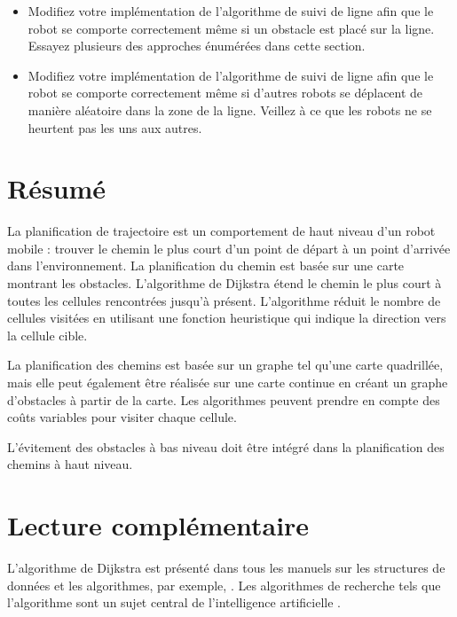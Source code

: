 \begin{framed}
\begin{itemize}
\item Modifiez votre implémentation de l'algorithme de suivi de ligne afin que le robot se comporte correctement même si un obstacle est placé sur la ligne. Essayez plusieurs des approches énumérées dans cette section.
\item Modifiez votre implémentation de l'algorithme de suivi de ligne afin que le robot se comporte correctement même si d'autres robots se déplacent de manière aléatoire dans la zone de la ligne. Veillez à ce que les robots ne se heurtent pas les uns aux autres.
\end{itemize}
\end{framed}

\section{Résumé}

La planification de trajectoire est un comportement de haut niveau d'un robot mobile : trouver le chemin le plus court d'un point de départ à un point d'arrivée dans l'environnement. La planification du chemin est basée sur une carte montrant les obstacles. L'algorithme de Dijkstra étend le chemin le plus court à toutes les cellules rencontrées jusqu'à présent. L'algorithme \astar{} réduit le nombre de cellules visitées en utilisant une fonction heuristique qui indique la direction vers la cellule cible.

La planification des chemins est basée sur un graphe tel qu'une carte quadrillée, mais elle peut également être réalisée sur une carte continue en créant un graphe d'obstacles à partir de la carte. Les algorithmes peuvent prendre en compte des coûts variables pour visiter chaque cellule.

L'évitement des obstacles à bas niveau doit être intégré dans la planification des chemins à haut niveau.

\section{Lecture complémentaire}

L'algorithme de Dijkstra est présenté dans tous les manuels sur les structures de données et les algorithmes, par exemple, \cite[Sect.~24.3]{crls3}. Les algorithmes de recherche tels que l'algorithme \astar{} sont un sujet central de l'intelligence artificielle \cite[Sect.~3.5]{ai}.
